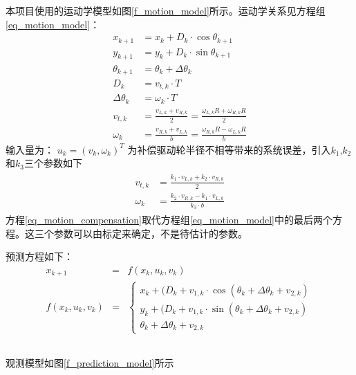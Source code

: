\documentclass[12pt,a4paper]{article}
\newcommand{\zhiv}{\fontsize{12pt}{18pt}\selectfont}      %
\begin{document}
本项目使用的运动学模型如图\ref{f_motion_model}所示。运动学关系见方程组\ref{eq_motion_model}：
\begin{equation}
\begin{split}
x_{k+1} &= x_k+D_k\cdot \cos\theta_{k+1} \\
y_{k+1} &= y_k+D_k\cdot \sin\theta_{k+1}  \\
\theta_{k+1} &= \theta_{k}+\Delta\theta_{k}\\
D_k  &= v_{t,k}\cdot T\\
\Delta\theta_k  &= \omega_{k}\cdot T\\
v_{t,k} &= \frac{v_{L,k}+v_{R,k} }{2} = \frac{\omega_{L,k}R+\omega_{R,k}R}{2} \\
\omega_{k} &= \frac{v_{R,k}+v_{L,k} }{b} = \frac{\omega_{R,k}R-\omega_{L,k}R}{b}
\end{split}
\label{eq_motion_model}
\end{equation}
输入量为：
$u_k=(v_k,\omega_k)^T$
为补偿驱动轮半径不相等带来的系统误差，引入$k_1$,$k_2$和$k_3$三个参数如下\parencite{KF_OGM}
\begin{eqnarray}
\begin{split}
v_{t,k} &= \frac{k_1\cdot v_{L,k}+k_2\cdot v_{R,k}}{2}\\
\omega_{k} &= \frac{k_2\cdot v_{R,k}-k_1\cdot v_{L,k}}{k_3\cdot b}
\end{split}
\label{eq_motion_compensation}
\end{eqnarray}
方程\ref{eq_motion_compensation}取代方程组\ref{eq_motion_model}中的最后两个方程。这三个参数可以由标定来确定，不是待估计的参数。


预测方程如下：
\begin{eqnarray}
x_{k+1} &=& f(x_k,u_k,v_k)\label{eq_pred1}\\
f(x_k,u_k,v_k) &=& \left\{ \begin{array}{l}
               x_k+(D_k+v_{1,k}\cdot\cos(\theta_k+\Delta\theta_k+v_{2,k}) \\
               y_k+(D_k+v_{1,k}\cdot\sin(\theta_k+\Delta\theta_k+v_{2,k}) \\
               \theta_k+\Delta\theta_k+v_{2,k}
               \end{array}\label{eq_pred2}
               \right.
\end{eqnarray}


{\subsection{\textbf{\song\zhiv{观测模型}}}}
观测模型如图\ref{f_prediction_model}所示\parencite{EKFforLocaliOGM15}
\end{document}
